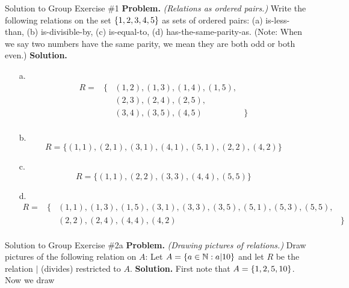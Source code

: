 \documentclass[10pt]{beamer}
\begin{document}
\begin{frame}{Solution to Group Exercise \#1}
\footnotesize 
\textbf{Problem.} \textit{(Relations as ordered pairs.)}  Write the following relations on the set $\{ {1,2,3,4,5} \}$ as sets of ordered pairs: (a) is-less-than, (b) is-divisible-by, (c) is-equal-to, (d) has-the-same-parity-as.  (Note: When we say two numbers have the same parity, we mean they are both odd or both even.)
\vfill 
\textbf{Solution.}
\begin{itemize}
\item[a.]
\[ \begin{array}{cccc}
R= & \bigg\{ & (1,2), (1,3), (1,4), (1,5), & \\
  & & (2,3), (2,4), (2,5),  &\\
   & & (3,4), (3,5), (4,5)  & \bigg\} \\
\end{array} \]    

\item[b.]
\[ R= \bigg\{  (1,1), (2,1), (3,1), (4,1), (5,1),(2,2), (4,2)  \bigg\} \]
\item[c.]
\[ R= \bigg\{  (1,1), (2,2), (3,3), (4,4), (5,5)  \bigg\} \]
\item[d.]
\[ \begin{array}{cccc}
R= & \bigg\{ & (1,1), (1,3), (1,5), (3,1), (3,3), (3,5), (5,1), (5,3), (5,5), & \\
   & & (2,2), (2,4), (4,4), (4,2)  & \bigg\} \\
\end{array} \]  
\end{itemize}
\end{frame}

\begin{frame}{Solution to Group Exercise \#2a}
\textbf{Problem.} \textit{(Drawing pictures of relations.)} 
	Draw pictures of the following relation on $A$: Let $A=\{ {a \in \mathbb{N} : a|10} \}$ and let $R$ be the relation $|$ (divides) restricted to $A$. 
\vfill 
\textbf{Solution.} First note that $A=\{ {1,2,5,10} \}$.  Now we draw

\begin{center}
\end{center}

\end{frame}
\end{document}
